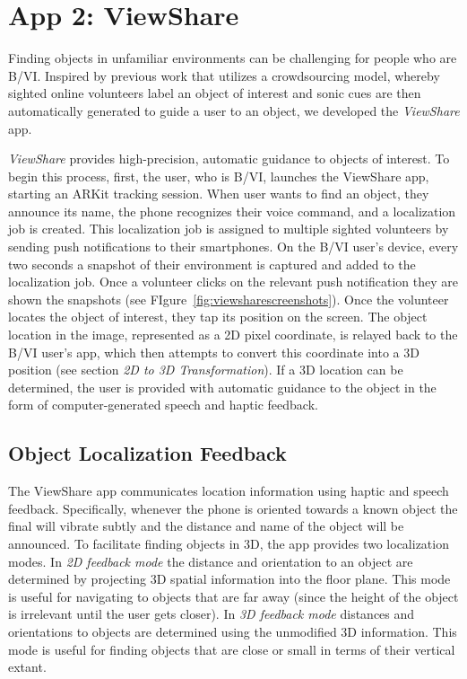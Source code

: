 \documentclass[chi_draft]{sigchi}
\newcommand{\BVI}{B/VI\xspace}
\begin{document}
\section{App 2: ViewShare}


Finding objects in unfamiliar environments can be challenging for people who are \BVI {}.  Inspired by previous work \cite{bigham2010vizwizlocateit} that utilizes a crowdsourcing model, whereby sighted online volunteers label an object of interest and sonic cues are then automatically generated to guide a user to an object, we developed the \emph{ViewShare} app.

\emph{ViewShare} provides high-precision, automatic guidance to objects of interest.  To begin this process, first, the user, who is \BVI, launches the ViewShare app, starting an ARKit tracking session.  When  user wants to find an object, they announce its name, the phone recognizes their voice command, and a localization job is created.  This localization job is assigned to multiple sighted volunteers by sending push notifications to their smartphones.  On the \BVI user's device, every two seconds a snapshot of their environment is captured and added to the localization job.  Once a volunteer clicks on the relevant push notification they are shown the snapshots (see FIgure~\ref{fig:viewsharescreenshots}).  Once the volunteer locates the object of interest, they tap its position on the screen.  The object location in the image, represented as a 2D pixel coordinate, is relayed back to the \BVI user's app, which then attempts to convert this coordinate into a 3D position (see section \emph{2D to 3D Transformation}).  If a 3D location can be determined, the user is provided with automatic guidance to the object in the form of computer-generated speech and haptic feedback.

\subsection{Object Localization Feedback}
The ViewShare app communicates location information using haptic and speech feedback.  Specifically, whenever the phone is oriented towards a known object the final will vibrate subtly and the distance and name of the object will be announced.  To facilitate finding objects in 3D, the app provides two localization modes.  In \emph{2D feedback mode} the distance and orientation to an object are determined by projecting 3D spatial information into the floor plane.  This mode is useful for navigating to objects that are far away (since the height of the object is irrelevant until the user gets closer).  In \emph{3D feedback mode} distances and orientations to objects are determined using the unmodified 3D information.  This mode is useful for finding objects that are close or small in terms of their vertical extant.%
\end{document}

